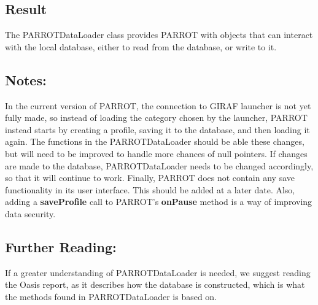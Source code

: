 \subsection{Result}
The PARROTDataLoader class provides PARROT with objects that can interact with the local database, either to read from the database, or write to it.

\subsection{Notes:}
In the current version of PARROT, the connection to GIRAF launcher is not yet fully made, so instead of loading the category chosen by the launcher, PARROT instead starts by creating a profile, saving it to the database, and then loading it again.
The functions in the PARROTDataLoader should be able these changes, but will need to be improved to handle more chances of null pointers.\newline
If changes are made to the database, PARROTDataLoader needs to be changed accordingly, so that it will continue to work.\newline
Finally, PARROT does not contain any save functionality in its user interface.
This should be added at a later date.
Also, adding a \textbf{saveProfile} call to PARROT's \textbf{onPause} method is a way of improving data security.

\subsection{Further Reading:}
If a greater understanding of PARROTDataLoader is needed, we suggest reading the Oasis report, as it describes how the database is constructed, which is what the methods found in PARROTDataLoader is based on.
